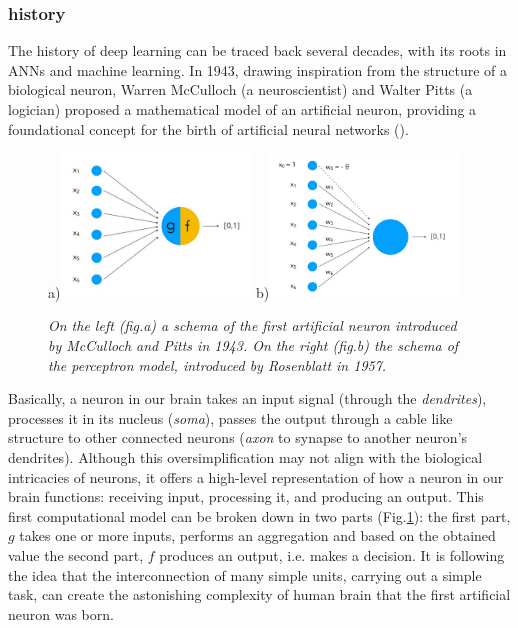 \documentclass[binding=0.6cm]{sapthesis}
\newcommand{\mycite}[1]{(\cite{#1})}
\begin{document}
\subsubsection{history}
\label{sec:bg.gnn.DL-history}
The history of deep learning can be traced back several decades, with its roots in ANNs and machine learning. In 1943, drawing inspiration from the structure of a biological neuron, Warren McCulloch (a neuroscientist) and Walter Pitts (a logician) proposed a mathematical model of an artificial neuron, providing a foundational concept for the birth of artificial neural networks \mycite{mcculloch-pitts-1943}.   
\begin{figure}
    \footnotesize a)\includegraphics[width=0.45\textwidth]{imgs/background/mcculloch-pitts-02.png} 
    \footnotesize b)\includegraphics[width=0.45\textwidth]{imgs/background/rosenblatt-02.png} 
    \caption{\textit{On the left (fig.a) a schema of the first artificial neuron introduced by McCulloch and Pitts in 1943. On the right (fig.b) the schema of the perceptron model, introduced by Rosenblatt in 1957.}}
    \label{fig:bg.first-neurons}
\end{figure}
Basically, a neuron in our brain takes an input signal (through the \textit{dendrites}), processes it in its nucleus (\textit{soma}), passes the output through a cable like structure to other connected neurons (\textit{axon} to synapse to another neuron’s dendrites). Although this oversimplification may not align with the biological intricacies of neurons, it offers a high-level representation of how a neuron in our brain functions: receiving input, processing it, and producing an output. This first computational model can be broken down in two parts (Fig.\ref{fig:bg.first-neurons}): the first part, $g$ takes one or more inputs, performs an aggregation and based on the obtained value the second part, $f$ produces an output, i.e. makes a decision. It is following the idea that the interconnection of many simple units, carrying out a simple task, can create the astonishing complexity of human brain that the first artificial neuron was born.
\end{document}
